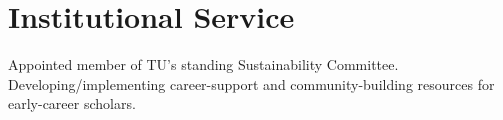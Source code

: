 \section{Institutional Service}

Appointed member of TU's standing Sustainability Committee.
Developing/implementing career-support and community-building resources for early-career scholars.
